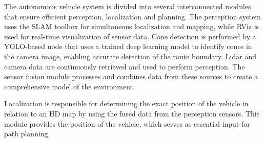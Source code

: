 The autonomous vehicle system is divided into several interconnected modules that ensure efficient perception, localization and planning. 
The perception system uses the SLAM toolbox for simultaneous localization and mapping, while RViz is used for real-time visualization of sensor data. 
Cone detection is performed by a YOLO-based node that uses a trained deep learning model to identify cones in the camera image, enabling accurate detection of the route boundary. 
Lidar and camera data are continuously retrieved and used to perform perception. The sensor fusion module processes and combines data from these sources to create a comprehensive model of the environment.

Localization is responsible for determining the exact position of the vehicle in relation to an HD map by using the fused data from the perception sensors. 
This module provides the position of the vehicle, which serves as essential input for path planning.